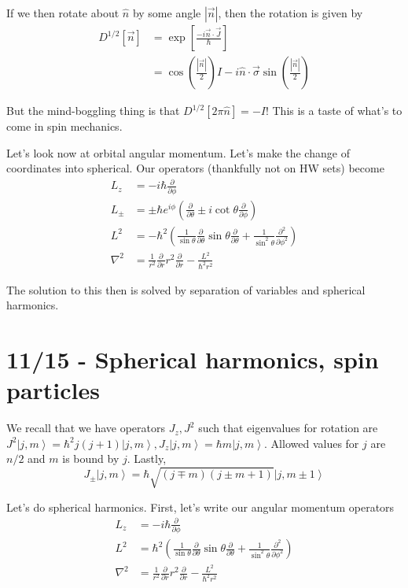 \documentclass[10pt]{report}
\newcommand{\ket}[1]{\left|#1\right>}
\newcommand{\pd}[2]{\frac{\partial #1}{\partial#2}}
\newcommand{\abs}[1]{\left|#1\right|}
\newcommand{\ptd}[2]{\frac{\partial^2 #1}{\partial#2^2}}
\begin{document}
If we then rotate about $\hat{n}$ by some angle $\abs{\vec{n}}$, then the rotation is given by
\begin{align}
    D^{1/2}[\vec{n}] &= \exp\left[ \frac{-i \vec{n}\cdot \vec{J}}{\hbar} \right]\\
    &= \cos\left( \frac{\abs{\vec{n}}}{2} \right)I - i\hat{n}\cdot \vec{\sigma}\sin\left( \frac{\abs{\vec{n}}}{2} \right)
\end{align}

But the mind-boggling thing is that $D^{1/2}[2\pi\hat{n}] = -I$! This is a taste of what's to come in spin mechanics.

Let's look now at orbital angular momentum. Let's make the change of coordinates into spherical. Our operators (thankfully not on HW sets) become
\begin{align}
    L_z &= -i\hbar \pd{}{\phi}\\
    L_{\pm} &= \pm\hbar e^{i\phi}\left( \pd{}{\theta} \pm i\cot \theta \pd{}{\phi} \right)\\
    L^2 &= -\hbar^2\left( \frac{1}{\sin\theta}\pd{}{\theta}\sin\theta\pd{}{\theta} + \frac{1}{\sin^2\theta} \ptd{}{\phi} \right)\\
    \nabla^2 &= \frac{1}{r^2}\pd{}{r}r^2\pd{}{r} - \frac{L^2}{\hbar^2 r^2}
\end{align}

The solution to this then is solved by separation of variables and spherical harmonics.
\chapter{11/15 - Spherical harmonics, spin particles}

We recall that we have operators $J_z, J^2$ such that eigenvalues for rotation are $J^2\ket{j,m} = \hbar^2 j(j+1)\ket{j,m}, J_z\ket{j,m} = \hbar m \ket{j,m}$. Allowed values for $j$ are $n/2$ and $m$ is bound by $j$. Lastly,
$$J_{\pm} \ket{j,m} = \hbar\sqrt{\left( j\mp m \right)\left( j\pm m + 1 \right)}\ket{j,m\pm 1}$$

Let's do spherical harmonics. First, let's write our angular momentum operators
\begin{align}
    L_z &= -i\hbar \pd{}{\phi}\\
    L^2 &= \hbar^2\left( \frac{1}{\sin\theta}\pd{}{\theta}\sin \theta \pd{}{\theta} + \frac{1}{\sin^2\theta}\ptd{}{\phi} \right)\\
    \nabla^2 &= \frac{1}{r^2} \pd{}{r} r^2\pd{}{r} - \frac{L^2}{\hbar^2 r^2}
\end{align}
\end{document}
